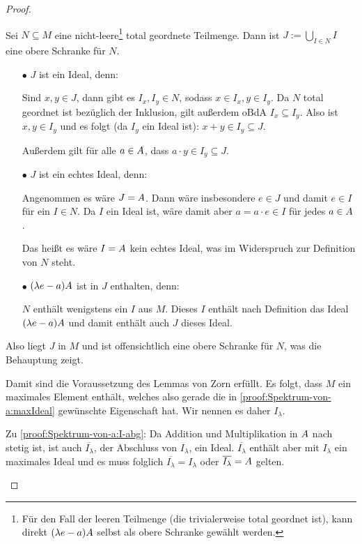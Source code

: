 \begin{proof}
\begin{itemize}
\Beh Sei $N \subseteq M$ eine nicht-leere\footnote{Für den Fall der leeren Teilmenge (die trivialerweise total geordnet ist), kann direkt $(\lambda e-a)A$ selbst als obere Schranke gewählt werden.} total geordnete Teilmenge. Dann ist $J := \bigcup_{I \in N} I$ eine obere Schranke für $N$.
\begin{itemize}
	\item[$\bullet$] $J$ ist ein Ideal, denn:
	
	Sind $x,y \in J$, dann gibt es $I_x, I_y \in N$, sodass $x \in I_x, y \in I_y$. Da $N$ total geordnet ist bezüglich der Inklusion, gilt außerdem oBdA $I_x \subseteq I_y$. Also ist $x,y \in I_y$ und es folgt (da $I_y$ ein Ideal ist): $x+y \in I_y \subseteq J$.
	
	Außerdem gilt für alle $a \in A$, dass $a\cdot y \in I_y \subseteq J$.
	
	\item[$\bullet$] $J$ ist ein echtes Ideal, denn:
	
	Angenommen es wäre $J = A$. Dann wäre insbesondere $e \in J$ und damit $e \in I$ für ein $I \in N$. Da $I$ ein Ideal ist, wäre damit aber $a = a\cdot e \in I$ für jedes $a \in A$.
	
	Das heißt es wäre $I = A$ kein echtes Ideal, was im Widerspruch zur Definition von $N$ steht.
	
	\item[$\bullet$] $(\lambda e-a)A$ ist in $J$ enthalten, denn:
	
	$N$ enthält wenigstens ein $I$ aus $M$. Dieses $I$ enthält nach Definition das Ideal $(\lambda e-a)A$ und damit enthält auch $J$ dieses Ideal.
\end{itemize}
Also liegt $J$ in $M$ und ist offensichtlich eine obere Schranke für $N$, was die Behauptung zeigt.

Damit sind die Voraussetzung des Lemmas von Zorn erfüllt. Es folgt, dass $M$ ein maximales Element enthält, welches also gerade die in \ref{proof:Spektrum-von-a:maxIdeal} gewünschte Eigenschaft hat. Wir nennen es daher $I_\lambda$.

Zu \ref{proof:Spektrum-von-a:I-abg}:
Da Addition und Multiplikation in $A$ nach  stetig ist, ist auch $\overline{I_\lambda}$, der Abschluss von $I_\lambda$, ein Ideal. $\overline{I_\lambda}$ enthält aber mit $I_\lambda$ ein maximales Ideal und es                        muss folglich $\overline{I_\lambda} = I_\lambda$ oder $\overline{I_\lambda} = A$ gelten.


\end{itemize}
\end{proof}
